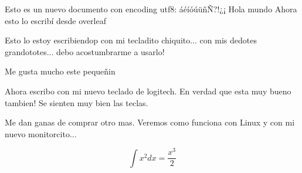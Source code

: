 \documentclass[12pt]{article}
\begin{document}
	
	Esto es un nuevo documento con encoding utf8: áéíóúüñÑ?!¿¡
Hola mundo
 Ahora esto lo escribí desde overleaf



 Esto lo estoy escribiendop con mi tecladito chiquito... con mis dedotes grandototes... debo acostumbrarme a  usarlo!

 Me gusta mucho este pequeñin


 Ahora escribo con mi nuevo teclado de logitech. En verdad que esta muy bueno tambien! Se sienten muy bien las teclas.

Me dan ganas de comprar otro mas. Veremos como funciona con Linux y con mi nuevo monitorcito...

\begin{equation}
    \int x^2 dx = \frac{x^3}{2}
\end{equation}
\end{document}
